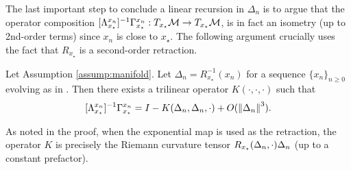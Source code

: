 The last important step to conclude a linear recursion in $\Delta_n$ is to argue that the operator composition
$ [\Lambda_{x_\star}^{x_n}]^{-1}\Gamma_{x_\star}^{x_n} : T_{x_\star}\mathcal{M} \to  T_{x_\star}\mathcal{M}$, is in fact an
isometry (up to 2nd-order terms) since $x_n$ is close to $x_\star$. The following argument crucially uses the fact that $R_{x_\star}$ is a second-order retraction.
\begin{lemma} \label{lem:tangent_rec_3}
 Let Assumption \ref{assump:manifold}. Let $\Delta_n = R_{x_{\star}}^{-1}(x_n)$ for a sequence  $\{ x_n \}_{n \geq 0}$ evolving as in . Then there exists a trilinear operator $K(\cdot,\cdot,\cdot)$ such that
  \[
    [\Lambda_{x_\star}^{x_n}]^{-1}\Gamma_{x_\star}^{x_n} = I - K(\Delta_n,\Delta_n, \cdot)   + O(\norm{\Delta_n}^3).
  \]
\end{lemma}
As noted in the proof, when the exponential map is used as the retraction, the operator $K$ is precisely the Riemann curvature tensor $R_{x_\star}(\Delta_n, \cdot)\Delta_n$ (up to a constant prefactor).

